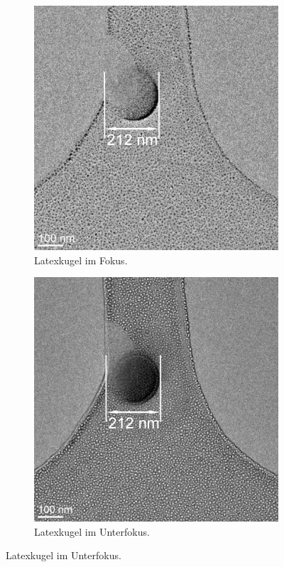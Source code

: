 \documentclass[slug=TEM, room=IFW, supervisor=?, coursedate=23.\ 01.\ 2020]{../../Lab_Report_LaTeX/lab_report}
\begin{document}
\begin{figure}[h]
	\centering
	\begin{subfigure}{.29\textwidth}
		\includegraphics[width=.8\textwidth]{../messungen/Fokus_Latex/auswertung/Fokus0m.jpg}
		\caption{Latexkugel im Fokus.}
		\label{fig:fokus}
	\end{subfigure}
	\begin{subfigure}{.29\textwidth}
		\includegraphics[width=.8\textwidth]{../messungen/Fokus_Latex/auswertung/Fokus20m.jpg}
		\caption{Latexkugel im Unterfokus.}
		\label{fig:unterfok}
	\end{subfigure}

\end{figure}
\end{document}
